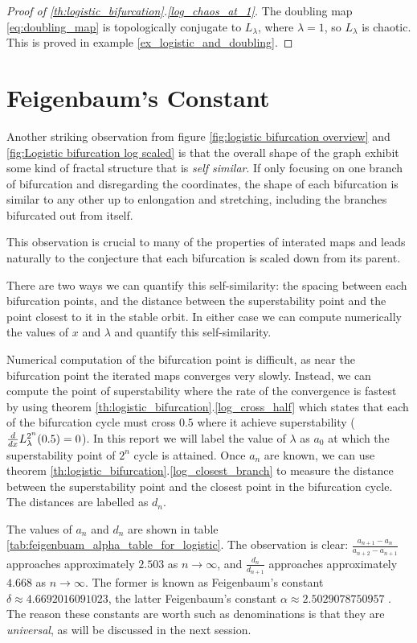 \begin{proof}[Proof of \ref{th:logistic_bifurcation}.\ref{log_chaos_at_1}]
	The doubling map \eqref{eq:doubling_map} is topologically conjugate to $L_{\lambda}$, where $\lambda = 1$, so $L_{\lambda}$ is chaotic.
	This is proved in example \ref{ex_logistic_and_doubling}.
\end{proof}

\section{Feigenbaum's Constant}

Another striking observation from figure \ref{fig:logistic bifurcation overview} and \ref{fig:Logistic bifurcation log scaled} is that the overall shape of the graph exhibit some kind of fractal structure that is \emph{self similar}.
If only focusing on one branch of bifurcation and disregarding the coordinates, the shape of each bifurcation is similar to any other up to enlongation and stretching, including the branches bifurcated out from itself.
 
 This observation is crucial to many of the properties of interated maps and leads naturally to the conjecture that each bifurcation is scaled down from its parent. 

 There are two ways we can quantify this self-similarity: the spacing between each bifurcation points, and the distance between the superstability point and the point closest to it in the stable orbit. 
 In either case we can compute numerically the values of $x$ and $\lambda$ and quantify this self-similarity.

 Numerical computation of the bifurcation point is difficult, as near the bifurcation point the iterated maps converges very slowly.
 Instead, we can compute the point of superstability where the rate of the convergence is fastest by using theorem \ref{th:logistic_bifurcation}.\ref{log_cross_half} which states that each of the bifurcation cycle must cross $0.5$ where it achieve superstability ($\frac{d}{dx}L_{\lambda}^{2^n}(0.5) = 0$).
In this report we will label the value of $\lambda$ as $a_0$ at which the superstability point of $2^n$ cycle is attained.
Once $a_n$ are known, we can use theorem \ref{th:logistic_bifurcation}.\ref{log_closest_branch} to measure the distance between the superstability point and the closest point in the bifurcation cycle. The distances are labelled as $d_n$.

The values of $a_n$ and $d_n$ are shown in table \ref{tab:feigenbuam_alpha_table_for_logistic}. 
The observation is clear:
$\frac{a_{n+1}-a_n}{a_{n+2}-a_{n+1}}$ approaches approximately $2.503$ as $n \rightarrow \infty$, and $\frac{d_n}{d_{n+1}}$ approaches approximately $4.668$ as $n \rightarrow \infty$. 
The former is known as Feigenbaum's constant $\delta \approx 4.6692016091023$, the latter Feigenbaum's constant $\alpha \approx 2.5029078750957$ \cite{F1}.
The reason these constants are worth such as denominations is that they are \emph{universal}, as will be discussed in the next session.


